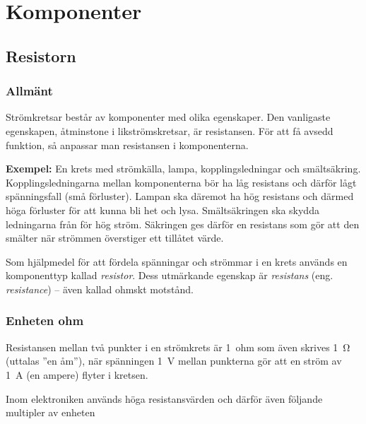 \chapter{Komponenter}
\label{komponenter}

\section{Resistorn}
\label{resistorn}

\subsection{Allmänt}

Strömkretsar består av komponenter med olika egenskaper.
Den vanligaste egenskapen, åtminstone i likströmskretsar, är resistansen.
För att få avsedd funktion, så anpassar man resistansen i komponenterna.

\textbf{Exempel:} En krets med strömkälla, lampa, kopplingsledningar och smältsäkring.
Kopplingsledningarna mellan komponenterna bör ha låg resistans och därför lågt
spänningsfall (små förluster).
Lampan ska däremot ha hög resistans och därmed höga förluster för att kunna bli
het och lysa.
Smältsäkringen ska skydda ledningarna från för hög ström.
Säkringen ges därför en resistans som gör att den smälter när strömmen
överstiger ett tillåtet värde.

Som hjälpmedel för att fördela spänningar och strömmar i en krets används
en komponenttyp kallad \emph{resistor}.
Dess utmärkande egenskap är \emph{resistans} (eng. \emph{resistance}) --
även kallad ohmskt motstånd.

\subsection{Enheten ohm}
\label{enheten_ohm}


Resistansen mellan två punkter i en strömkrets är 1~ohm som även skrives
\SI{1}{\ohm} (uttalas ''en åm''), när spänningen \SI{1}{\volt} mellan punkterna
gör att en ström av \SI{1}{\ampere} (en ampere) flyter i kretsen.

Inom elektroniken används höga resistansvärden och därför även följande
multipler av enheten

